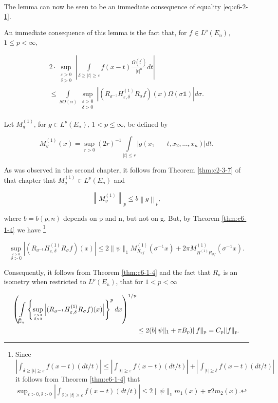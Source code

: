 The lemma can now be seen to be an immediate consequence of equality \eqref{eq:c6-2-1}.

An immediate consequence of this lemma is the fact that, for $f \in L^p(E_n)$, $1 \leq p < \infty$,

\begin{equation}\label{eq:c6-2-3}
\begin{aligned}2\cdot\sup_{\substack{\varepsilon>0\\ \delta>0}}\left|\int\limits_{\delta\geq|t|\geq\varepsilon}f(x-t)\frac{\Omega(t^{\prime})}{|t|^{n}}dt\right|\\\leq\int\limits_{SO(n)}\sup_{\substack{\varepsilon>0\\ \delta>0}}\left|(R_{\sigma^{-1}}H^{(1)}_{\varepsilon,\delta}R_{\sigma}f)(x)\Omega(\sigma\mathbb{1})\right|d\sigma.\end{aligned}
\end{equation}

Let $M_g^{(1)}$, for $g \in L^p(E_n)$, $1 < p \leq \infty$, be defined by

\[
M_{g}^{(1)}(x)=\sup_{r>0}\left(2r\right)^{-1}\int\limits_{|t|\leq r}\left|g(x_{1}\;-\;t,x_{2},\ldots,x_{n})\right|d t.
\]

As was observed in the second chapter, it follows from Theorem \ref{thm:c2-3-7} of that chapter that $M_g^{(1)} \in L^p(E_n)$ and

\[
\left\|M_{g}^{(1)}\right\|_{p}\leq b\left\|g\right\|_{p},
\]

where $b = b(p, n)$ depends on p and n, but not on g. But, by Theorem \ref{thm:c6-1-4} we have \footnote{Since $|\int_{\delta\geq|t|\geq\varepsilon}f(x-t)(dt/t)|\leq|\int_{|t|\geq\varepsilon}f(x-t)(dt/t)|+|\int_{|t|\geq\delta}f(x-t)(dt/t)|$ it follows from Theorem \ref{thm:c6-1-4} that $\sup_{\varepsilon>0,\delta>0}|\int_{\delta\geq|t|\geq\varepsilon}f(x-t)(dt/t)|\leq2\|\psi\|_{1}m_1(x)+\pi2m_2(x)$.}

\[
\sup_{\stackrel{\varepsilon>0}{\delta>0}}\left|(R_{\sigma^{-1}}H_{\varepsilon,\delta}^{(1)}R_{\sigma}f)(x)\right|\leq2\|\psi\|_{1}M_{R_{\sigma f}}^{(1)}(\sigma^{-1}x)+2\pi M_{H^{(1)}R_{\sigma f}}^{(1)}(\sigma^{-1}x).
\]

Consequently, it follows from Theorem \ref{thm:c6-1-4} and the fact that $R_\sigma$ is an isometry when restricted to $L^p(E_n)$, that for $1 < p < \infty$

\begin{equation}\label{eq:c6-2-4}
\begin{aligned}{\left(\intop_{\tilde{E}_{n}}\left\{\sup_{\varepsilon>0\atop\delta>0}\left|(R_{\sigma^{-1}}H_{\varepsilon,\delta}^{(1)}R_{\sigma}f)(x)\right|\right\}^{p}d x\right)^{1/p}}&{{}}\\ {}&{{}\leq2(b\|\psi\|_{1}+\pi B_{p})\|f\|_{p}=C_{p}\|f\|_{p}.}\\ \end{aligned}
\end{equation}

